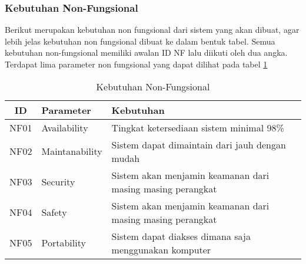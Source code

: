 \subsubsection{Kebutuhan Non-Fungsional}
Berikut merupakan kebutuhan non fungsional dari sistem yang akan dibuat, agar lebih jelas kebutuhan non fungsional dibuat ke dalam bentuk tabel. Semua kebutuhan non-fungsional memiliki awalan ID NF lalu diikuti oleh dua angka. Terdapat lima parameter non fungsional yang dapat dilihat pada tabel \ref{tab:kebutuhan-non-fungsional}
\begin{table}[h]
  \caption{Kebutuhan Non-Fungsional}
  \label{tab:kebutuhan-non-fungsional}
  \centering
  \begin{tabular}{|c|p{3cm}|p{8cm}|}
    \hline
    ID   & Parameter      & Kebutuhan                                                  \\
    \hline
    NF01 & Availability   & Tingkat ketersediaan sistem minimal 98\%                   \\
    \hline
    NF02 & Maintanability & Sistem dapat dimaintain dari jauh dengan mudah             \\
    \hline
    NF03 & Security       & Sistem akan menjamin keamanan dari masing masing perangkat \\
    \hline
    NF04 & Safety         & Sistem akan menjamin keamanan dari masing masing perangkat \\
    \hline
    NF05 & Portability    & Sistem dapat diakses dimana saja menggunakan komputer      \\
    \hline
  \end{tabular}
\end{table}